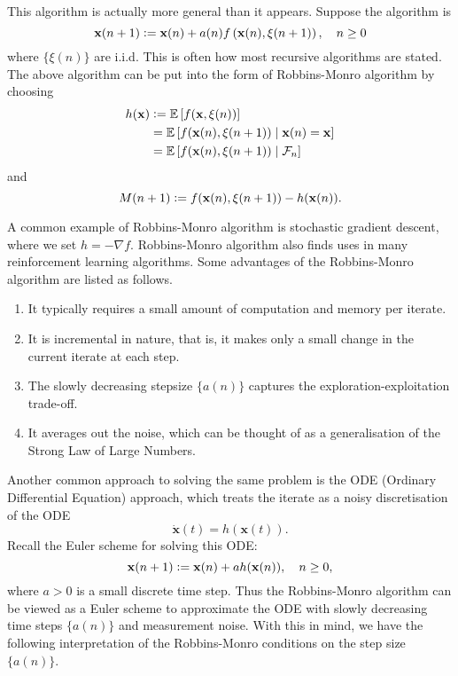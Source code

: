 This algorithm is actually more general than it appears. Suppose the algorithm is 
\[
    \mathbf{x}(n+1) \vcentcolon= \mathbf{x}(n) + a(n) f\left( \mathbf{x}(n), \xi(n+1) \right), \quad n \geq 0
\]
where $\{\xi(n)\}$ are i.i.d. This is often how most recursive algorithms are stated. The above algorithm can be put into the form of Robbins-Monro algorithm by choosing
\begin{align*}
    h(\mathbf{x}) &\vcentcolon= \mathbb{E} \left[ f(\mathbf{x}, \xi(n)) \right] \\
    &= \mathbb{E} \left[ f(\mathbf{x}(n), \xi(n+1)) \mid \mathbf{x}(n) = \mathbf{x} \right] \\
    &= \mathbb{E} \left[ f(\mathbf{x}(n), \xi(n+1)) \mid \mathcal{F}_n \right]
\end{align*}
and
\[
    M(n+1) \vcentcolon= f(\mathbf{x}(n),\xi(n+1)) - h(\mathbf{x}(n)).
\]

A common example of Robbins-Monro algorithm is stochastic gradient descent, where we set $h = -\nabla f$. Robbins-Monro algorithm also finds uses in many reinforcement learning algorithms. Some advantages of the Robbins-Monro algorithm are listed as follows. 

\begin{enumerate}
    \item It typically requires a small amount of computation and memory per iterate.
    \item It is incremental in nature, that is, it makes only a small change in the current iterate at each step.
    \item The slowly decreasing stepsize $\{a(n)\}$ captures the exploration-exploitation trade-off.
    \item It averages out the noise, which can be thought of as a generalisation of the Strong Law of Large Numbers.
\end{enumerate}

Another common approach to solving the same problem is the ODE (Ordinary Differential Equation) approach, which treats the iterate as a noisy discretisation of the ODE 
\[
    \dot{\mathbf{x}}(t) = h(\mathbf{x}(t)).
\]
Recall the Euler scheme for solving this ODE:
\[
    \mathbf{x}(n+1) \vcentcolon= \mathbf{x}(n) + ah(\mathbf{x}(n)), \quad n \geq 0,
\]
where $a > 0$ is a small discrete time step. Thus the Robbins-Monro algorithm can be viewed as a Euler scheme to approximate the ODE with slowly decreasing time steps $\{a(n)\}$ and measurement noise. With this in mind, we have the following interpretation of the Robbins-Monro conditions on the step size $\{a(n)\}$. 

